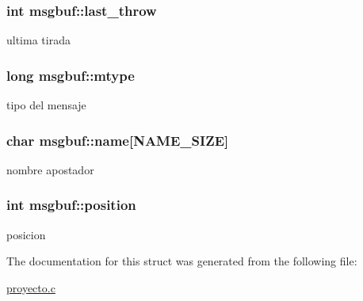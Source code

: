 \subsubsection[{\texorpdfstring{last\+\_\+throw}{last_throw}}]{\setlength{\rightskip}{0pt plus 5cm}int msgbuf\+::last\+\_\+throw}\hypertarget{structmsgbuf_a2b1acedae627a698a89d2503665c593d}{}\label{structmsgbuf_a2b1acedae627a698a89d2503665c593d}
ultima tirada 
\subsubsection[{\texorpdfstring{mtype}{mtype}}]{\setlength{\rightskip}{0pt plus 5cm}long msgbuf\+::mtype}\hypertarget{structmsgbuf_a12a4780abaa96553f2ebf5fafeb58360}{}\label{structmsgbuf_a12a4780abaa96553f2ebf5fafeb58360}
tipo del mensaje 
\subsubsection[{\texorpdfstring{name}{name}}]{\setlength{\rightskip}{0pt plus 5cm}char msgbuf\+::name\mbox{[}{\bf N\+A\+M\+E\+\_\+\+S\+I\+ZE}\mbox{]}}\hypertarget{structmsgbuf_a72921f6ad2d6985d78d0e0fd1ae00774}{}\label{structmsgbuf_a72921f6ad2d6985d78d0e0fd1ae00774}
nombre apostador 
\subsubsection[{\texorpdfstring{position}{position}}]{\setlength{\rightskip}{0pt plus 5cm}int msgbuf\+::position}\hypertarget{structmsgbuf_a0a654069b1868c3be58115550ed078fa}{}\label{structmsgbuf_a0a654069b1868c3be58115550ed078fa}
posicion 

The documentation for this struct was generated from the following file\+:\begin{DoxyCompactItemize}
\item 
\hyperlink{proyecto_8c}{proyecto.\+c}\end{DoxyCompactItemize}
